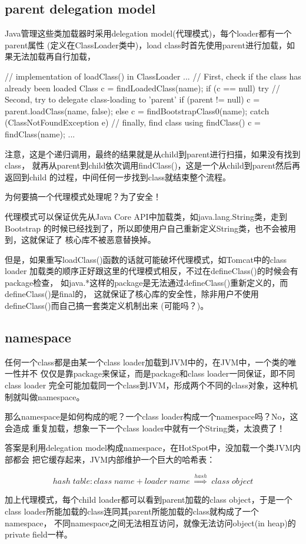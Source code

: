 \subsection[parent delegation model]{parent delegation model}
\label{sec:delegationmodel}
Java管理这些类加载器时采用delegation model(代理模式)，每个loader都有一个parent属性
(定义在ClassLoader类中)，load class时首先使用parent进行加载，如果无法加载再自行加载，

\begin{javacode}
// implementation of loadClass() in ClassLoader
...
// First, check if the class has already been loaded
Class c = findLoadedClass(name);
if (c == null) {
  try {
    // Second, try to delegate class-loading to 'parent'
    if (parent != null) {
      c = parent.loadClass(name, false);
    } else {
      c = findBootstrapClass0(name);
    }
  } catch (ClassNotFoundException e) {
    // finally, find class using findClass()
    c = findClass(name);
  }
}
...
\end{javacode}

注意，这是个递归调用，最终的结果就是从child到parent进行扫描，如果没有找到class，
就再从parent到child依次调用findClass()，这是一个从child到parent然后再返回到child
的过程，中间任何一步找到class就结束整个流程。

为何要搞一个代理模式处理呢？为了安全！

代理模式可以保证优先从Java Core API中加载类，如java.lang.String类，走到Bootstrap
的时候已经找到了，所以即使用户自己重新定义String类，也不会被用到，这就保证了
核心库不被恶意替换掉。

但是，如果重写loadClass()函数的话就可能破坏代理模式，如Tomcat中的class loader
加载类的顺序正好跟这里的代理模式相反，不过在defineClass()的时候会有package检查，
如java.*这样的package是无法通过defineClass()重新定义的，而defineClass()是final的，
这就保证了核心库的安全性，除非用户不使用defineClass()而自己搞一套类定义机制出来
(可能吗？)。

\subsection[namespace]{namespace}
任何一个class都是由某一个class loader加载到JVM中的，在JVM中，一个类的唯一性并不
仅仅是靠package来保证，而是package和class loader一同保证，即不同class loader
完全可能加载同一个class到JVM，形成两个不同的class对象，这种机制就叫做namespace。

那么namespace是如何构成的呢？一个class loader构成一个namespace吗？No，这会造成
重复加载，想象一下一个class loader中就有一个String类，太浪费了！

答案是利用delegation model构成namespace，在HotSpot中，没加载一个类JVM内部都会
把它缓存起来，JVM内部维护一个巨大的哈希表：

$$hash\;table: class\;name+loader\;name\;\overset{hash}\Longrightarrow\;class\;object$$

加上代理模式，每个child loader都可以看到parent加载的class object，于是一个
class loader所能加载的class连同其parent所能加载的class就构成了一个namespace，
不同namespace之间无法相互访问，就像无法访问object(in heap)的private field一样。
